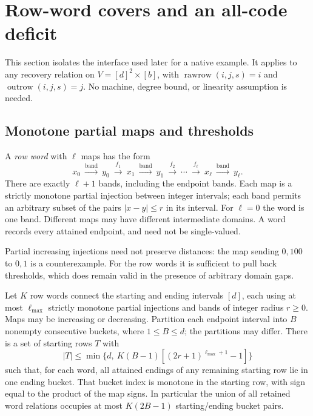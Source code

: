 \section{Row-word covers and an all-code deficit}\label{sec:row-words}

This section isolates the interface used later for a native example.
It applies to any recovery relation on $V=[d]^2\times[b]$, with
$\operatorname{rawrow}(i,j,s)=i$ and
$\operatorname{outrow}(i,j,s)=j$. No machine, degree bound, or
linearity assumption is needed.

\subsection{Monotone partial maps and thresholds}

A \emph{row word} with $\ell$ maps has the form
\[
 x_0\ \xrightarrow{\mathrm{band}}\ y_0
 \ \xrightarrow{f_1}\ x_1
 \ \xrightarrow{\mathrm{band}}\ y_1
 \ \xrightarrow{f_2}\ \cdots
 \ \xrightarrow{f_\ell}\ x_\ell
 \ \xrightarrow{\mathrm{band}}\ y_\ell.
\]
There are exactly $\ell+1$ bands, including the endpoint bands.
Each map is a strictly monotone partial injection between integer intervals;
each band permits an arbitrary subset of the pairs $|x-y|\le r$ in its
interval.  For $\ell=0$ the word is one band.  Different maps may have
different intermediate domains.  A word records every attained endpoint,
and need not be single-valued.

Partial increasing injections need not preserve distances: the map sending
$0,100$ to $0,1$ is a counterexample.  For the row words it is sufficient
to pull back thresholds, which does remain valid in the presence of
arbitrary domain gaps.

\begin{lemma}\label{lem:cd-threshold}
Let $K$ row words connect the starting and ending intervals $[d]$, each
using at most $\ell_{\max}$ strictly monotone partial injections and bands of integer
radius $r\ge0$.  Maps may be increasing or decreasing.  Partition each endpoint
interval into $B$ nonempty consecutive buckets, where $1\le B\le d$;
the partitions may differ.  There is a set of starting rows $T$ with
\[
 |T|\le\min\{d,\ K(B-1)[(2r+1)^{\ell_{\max}+1}-1]\}
\]
such that, for each word, all attained endings of any remaining starting
row lie in one ending bucket.  That bucket index is monotone in the
starting row, with sign equal to the product of the map signs.  In
particular the union of all retained word relations occupies at most
$K(2B-1)$ starting/ending bucket pairs.
\end{lemma}

